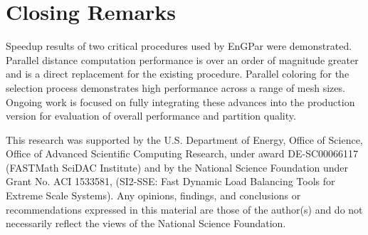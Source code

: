 \documentclass[graybox]{svmult}
\begin{document}
\section{Closing Remarks} \label{sec:closing}
Speedup results of two critical procedures used by EnGPar were demonstrated.
Parallel distance computation performance is over an order of magnitude greater
and is a direct replacement for the existing procedure.
Parallel coloring for the selection process demonstrates high performance
across a range of mesh sizes.
Ongoing work is focused on fully integrating these advances into the production
version for evaluation of overall performance and partition quality.

\begin{acknowledgement}
This research was supported by the U.S. Department of Energy, Office of Science,
Office of Advanced Scientific Computing Research, under award DE-SC00066117
(FASTMath SciDAC Institute) and by the National Science Foundation under Grant
No. ACI 1533581, (SI2-SSE: Fast Dynamic Load Balancing Tools for Extreme Scale
Systems).
Any opinions, findings, and conclusions or recommendations expressed in this
material are those of the author(s) and do not necessarily reflect the views
of the National Science Foundation.
\end{acknowledgement}



\end{document}
